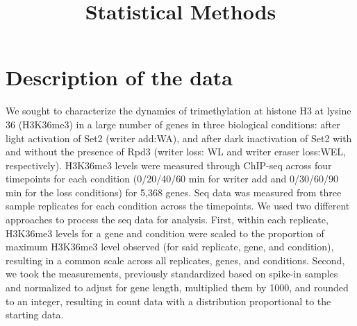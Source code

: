 \documentclass[12pt]{extarticle}
\title{Statistical Methods}
\date{}
\begin{document}
\maketitle

\section*{Description of the data}
We sought to characterize the dynamics of trimethylation at histone H3 at lysine 36 (H3K36me3) in a large number of genes in three biological conditions: after light activation of Set2 (writer add:WA), and after dark inactivation of Set2 with and without the presence of Rpd3 (writer loss: WL and writer eraser loss:WEL, respectively). H3K36me3 levels were measured through ChIP-seq across four timepoints for each condition (0/20/40/60 min for writer add and 0/30/60/90 min for the loss conditions) for 5,368 genes. Seq data was measured from three sample replicates for each condition across the timepoints. We used two different approaches to process the seq data for analysis. First, within each replicate, H3K36me3 levels for a gene and condition were scaled to the proportion of maximum H3K36me3 level observed (for said replicate, gene, and condition), resulting in a common scale across all replicates, genes, and conditions. Second, we took the measurements, previously standardized based on spike-in samples and normalized to adjust for gene length, multiplied them by 1000, and rounded to an integer, resulting in count data with a distribution proportional to the starting data. 
\end{document}
